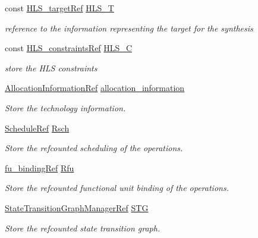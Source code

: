 \begin{DoxyCompactItemize}
const \hyperlink{hls__target_8hpp_a390f1d55d3b31739665ff2776abe2a3f}{H\+L\+S\+\_\+target\+Ref} \hyperlink{classhls_af633e6a35e5a7d4074ca9b525955399b}{H\+L\+S\+\_\+T}
\begin{DoxyCompactList}\small\item\em reference to the information representing the target for the synthesis \end{DoxyCompactList}\item 
const \hyperlink{hls__constraints_8hpp_ac394d1c5cd991614133724294a79182b}{H\+L\+S\+\_\+constraints\+Ref} \hyperlink{classhls_a3d8e89506a2b39dc89ef71e2782a4c85}{H\+L\+S\+\_\+C}
\begin{DoxyCompactList}\small\item\em store the H\+LS constraints \end{DoxyCompactList}\item 
\hyperlink{allocation__information_8hpp_ad90a86da153cba50cbcefc4679036755}{Allocation\+Information\+Ref} \hyperlink{classhls_a277a18e57c5d5a124cfc840174e5a676}{allocation\+\_\+information}
\begin{DoxyCompactList}\small\item\em Store the technology information. \end{DoxyCompactList}\item 
\hyperlink{schedule_8hpp_af67f402958b3b52a1ec5cc4ce08ae3b9}{Schedule\+Ref} \hyperlink{classhls_ac03911288ca9f62135c2d74f01d49b4b}{Rsch}
\begin{DoxyCompactList}\small\item\em Store the refcounted scheduling of the operations. \end{DoxyCompactList}\item 
\hyperlink{fu__binding_8hpp_a619181df8ab98d7b7e17de58ac44b065}{fu\+\_\+binding\+Ref} \hyperlink{classhls_a98ce478f5726273b5978a18df5bbe3c3}{Rfu}
\begin{DoxyCompactList}\small\item\em Store the refcounted functional unit binding of the operations. \end{DoxyCompactList}\item 
\hyperlink{state__transition__graph__manager_8hpp_af0c5e63a678c09ef63a87b9cbe427978}{State\+Transition\+Graph\+Manager\+Ref} \hyperlink{classhls_a7dfd09bac28f7aa9cfdda5b539e4c0c7}{S\+TG}
\begin{DoxyCompactList}\small\item\em Store the refcounted state transition graph. \end{DoxyCompactList}\item 

\end{DoxyCompactItemize}
